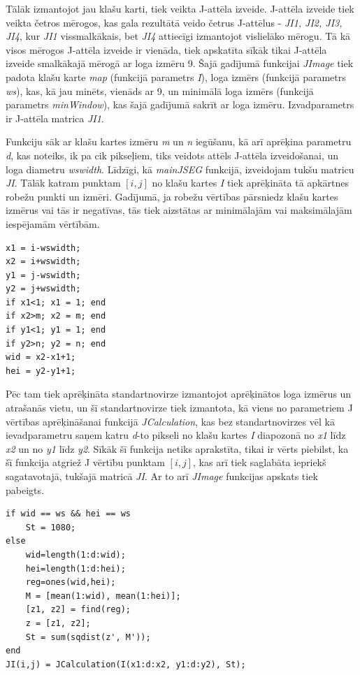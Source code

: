 \documentclass[12pt,paper=a4]{report}
\begin{document}
Tālāk izmantojot jau klašu karti, tiek veikta J-attēla izveide. J-attēla izveide tiek veikta četros mērogos, kas gala rezultātā veido četrus J-attēlus - \textit{JI1, JI2, JI3, JI4}, kur \textit{JI1} vissmalkākais, bet \textit{JI4} attiecīgi izmantojot vislielāko mērogu. Tā kā visos mērogos J-attēla izveide ir vienāda, tiek apskatīta sīkāk tikai J-attēla izveide smalkākajā mērogā ar loga izmēru 9. Šajā gadījumā funkcijai \textit{JImage} tiek padota klašu karte \textit{map} (funkcijā parametrs \textit{I}), loga izmērs (funkcijā parametrs \textit{ws}), kas, kā jau minēts, vienāds ar 9, un minimālā loga izmērs (funkcijā parametrs \textit{minWindow}), kas šajā gadījumā sakrīt ar loga izmēru. Izvadparametrs ir J-attēla matrica \textit{JI1}. \par
Funkciju sāk ar klašu kartes izmēru \textit{m} un \textit{n} iegūšanu, kā arī aprēķina parametru \textit{d}, kas noteiks, ik pa cik pikseļiem, tiks veidots attēls J-attēla izveidošanai, un loga diametru \textit{wswidth}. Līdzīgi, kā \textit{mainJSEG} funkcijā, izveidojam tukšu matricu \textit{JI}. Tālāk katram punktam $[i,j]$ no klašu kartes \textit{I} tiek aprēķināta tā apkārtnes robežu punkti un izmēri. Gadījumā, ja robežu vērtības pārsniedz klašu kartes izmērus vai tās ir negatīvas, tās tiek aizstātas ar minimālajām vai maksimālajām iespējamām vērtībām. 
\begin{lstlisting}
x1 = i-wswidth;
x2 = i+wswidth;
y1 = j-wswidth;
y2 = j+wswidth;
if x1<1; x1 = 1; end
if x2>m; x2 = m; end
if y1<1; y1 = 1; end
if y2>n; y2 = n; end
wid = x2-x1+1;
hei = y2-y1+1;
\end{lstlisting}
Pēc tam tiek aprēķināta standartnovirze izmantojot aprēķinātos loga izmērus un atrašanās vietu, un šī standartnovirze tiek izmantota, kā viens no parametriem J vērtības aprēķināšanai funkcijā \textit{JCalculation}, kas bez standartnovirzes vēl kā ievadparametru saņem katru \textit{d}-to pikseli no klašu kartes \textit{I} diapozonā no \textit{x1} līdz \textit{x2} un no \textit{y1} līdz \textit{y2}. Sīkāk šī funkcija netiks aprakstīta, tikai ir vērts piebilst, ka šī funkcija atgriež J vērtību punktam $[i,j]$, kas arī tiek saglabāta iepriekš sagatavotajā, tukšajā matricā \textit{JI}. Ar to arī \textit{JImage} funkcijas apskats tiek pabeigts.
\begin{lstlisting}
if wid == ws && hei == ws
	St = 1080; 
else
	wid=length(1:d:wid);
    hei=length(1:d:hei);
    reg=ones(wid,hei);
    M = [mean(1:wid), mean(1:hei)];
    [z1, z2] = find(reg);
    z = [z1, z2];
    St = sum(sqdist(z', M'));
end
JI(i,j) = JCalculation(I(x1:d:x2, y1:d:y2), St);
\end{lstlisting}\par
\end{document}
